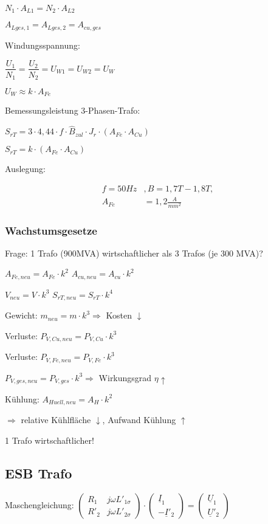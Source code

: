 	$N_{1} \cdot A_{L1} = N_{2} \cdot A_{L2}$

	$A_{Lges,1} = A_{Lges,2} = A_{cu,ges} $

	Windungsspannung:

	$\dfrac{U_{1}}{N_{1}} = \dfrac{U_{2}}{N_{2}} = U_{W1} = U_{W2} = U_{W}$

	$U_{W} \approx k \cdot A_{Fe}$

	Bemessungsleistung 3-Phasen-Trafo:

	$S_{rT} = 3 \cdot 4,44 \cdot f \cdot \hat{B}_{zul} \cdot J_{r} \cdot (A_{Fe} \cdot A_{Cu})$

	$S_{rT} = k \cdot (A_{Fe} \cdot A_{Cu})$

	Auslegung:

    \begin{align*}
        f = 50Hz &, B = 1,7 T - 1,8 T,\\ A_{Fe} &= 1,2 \frac{A}{mm^{2}}
    \end{align*}

	\subsubsection{Wachstumsgesetze}

	Frage: 1 Trafo (900MVA) wirtschaftlicher als 3 Trafos (je 300 MVA)?

	$A_{Fe,neu} = A_{Fe} \cdot k^2$ \quad $A_{cu,neu} = A_{cu} \cdot k^2$ \quad

	$V_{neu} = V \cdot k^3$ \quad $S_{rT,neu} = S_{rT} \cdot k^4$

	Gewicht: $m_{neu} = m \cdot k^3 \Rightarrow$ Kosten $\downarrow$

	Verluste: $P_{V,Cu,neu} = P_{V,Cu} \cdot k^3$

	Verluste: $P_{V,Fe,neu} = P_{V,Fe} \cdot k^3$

	$P_{V,ges,neu} = P_{V,ges} \cdot k^3 \Rightarrow$ Wirkungsgrad $\eta \uparrow$

	Kühlung: $A_{Huell,neu} = A_H \cdot k^2$

	$\Rightarrow$ relative Kühlfläche $\downarrow$, Aufwand Kühlung $\uparrow$

	1 Trafo wirtschaftlicher!

	\subsection{ESB Trafo}

	Maschengleichung:
	$
	\begin{pmatrix}
		R_{1} & j\omega L'_{1\sigma} \\
		R'_{2} & j\omega L'_{2\sigma}
	\end{pmatrix} \cdot
	\begin{pmatrix}
		\underline{I}_{1} \\
		-\underline{I}'_{2}
	\end{pmatrix} =
	\begin{pmatrix}
		\underline{U}_{1} \\
		\underline{U}'_{2}
	\end{pmatrix}
	$

